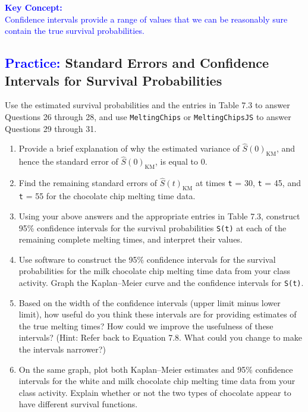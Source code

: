 \documentclass[
]{report}
\begin{document}
\textbf{\textcolor{blue}{Key Concept:}}\\
\textcolor{blue}{Confidence intervals provide a range of values that we can be reasonably sure contain the true survival probabilities.}

\hypertarget{standard-errors-and-confidence-intervals-for-survival-probabilities}{%
\subsection*{\texorpdfstring{\textcolor{blue}{Practice:} Standard Errors and Confidence Intervals for Survival Probabilities}{ Standard Errors and Confidence Intervals for Survival Probabilities}}\label{standard-errors-and-confidence-intervals-for-survival-probabilities}}

Use the estimated survival probabilities and the entries in Table 7.3 to answer Questions 26 through 28, and use \texttt{MeltingChips} or \texttt{MeltingChipsJS} to answer Questions 29 through 31.

\begin{enumerate}
\def\labelenumi{\arabic{enumi}.}
\setcounter{enumi}{25}
\item
  Provide a brief explanation of why the estimated variance of \(\scriptstyle \hat S(0)_{\mathrm{KM}}\), and hence the standard error of \(\scriptstyle \hat S(0)_{\mathrm{KM}}\), is equal to 0.
\item
  Find the remaining standard errors of \(\scriptstyle \hat S(t)_{\mathrm{KM}}\) at times \texttt{t} = 30, \texttt{t} = 45, and \texttt{t} = 55 for the chocolate chip melting time data.
\item
  Using your above answers and the appropriate entries in Table 7.3, construct 95\% confidence intervals for the survival probabilities \texttt{S(t)} at each of the remaining complete melting times, and interpret their values.
\item
  Use software to construct the 95\% confidence intervals for the survival probabilities for the milk chocolate chip melting time data from your class activity. Graph the Kaplan--Meier curve and the confidence intervals for \texttt{S(t)}.
\item
  Based on the width of the confidence intervals (upper limit minus lower limit), how useful do you think these intervals are for providing estimates of the true melting times? How could we improve the usefulness of these intervals? (Hint: Refer back to Equation 7.8. What could you change to make the intervals narrower?)
\item
  On the same graph, plot both Kaplan--Meier estimates and 95\% confidence intervals for the white and milk chocolate chip melting time data from your class activity. Explain whether or not the two types of chocolate appear to have different survival functions.
\end{enumerate}
\end{document}
